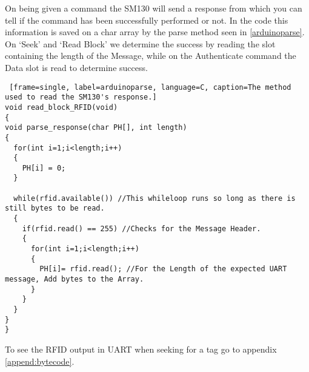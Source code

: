On being given a command the SM130 will send a response from which you can tell if the command has been successfully performed or not.
In the code this information is saved on a char array by the parse method seen in \autoref{arduinoparse}. 
On `Seek' and `Read Block' we determine the success by reading the slot containing the length of the Message, while on the Authenticate command the Data slot is read to determine success.

\begin{lstlisting} [frame=single, label=arduinoparse, language=C, caption=The method used to read the SM130's response.]
void read_block_RFID(void)
{
void parse_response(char PH[], int length)
{
  for(int i=1;i<length;i++)
  {
    PH[i] = 0;
  }
  
  while(rfid.available()) //This whileloop runs so long as there is still bytes to be read. 
  {
    if(rfid.read() == 255) //Checks for the Message Header.
    {
      for(int i=1;i<length;i++)
      {
        PH[i]= rfid.read(); //For the Length of the expected UART message, Add bytes to the Array.
      }
    }
  }
}
}													
\end{lstlisting}
To see the RFID output in UART when seeking for a tag go to appendix \vref{append:bytecode}.